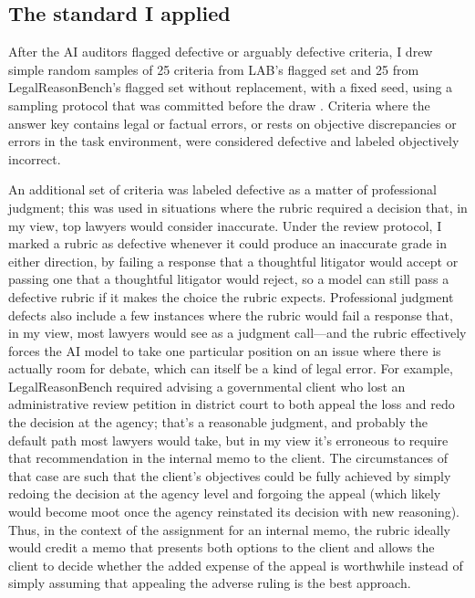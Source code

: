 \documentclass[11pt]{article}
\newcommand{\labSample}{25}
\newcommand{\lrbSample}{25}
\begin{document}
\subsection{The standard I applied}

After the AI auditors flagged defective or arguably defective criteria, I drew simple random samples of \labSample{} criteria from LAB's flagged set and \lrbSample{} from LegalReasonBench's flagged set without replacement, with a fixed seed, using a sampling protocol that was committed before the draw \citep{labreview,lrbreview}. Criteria where the answer key contains legal or factual errors, or rests on objective discrepancies or errors in the task environment, were considered defective and labeled objectively incorrect.

An additional set of criteria was labeled defective as a matter of professional judgment; this was used in situations where the rubric required a decision that, in my view, top lawyers would consider inaccurate. Under the review protocol, I marked a rubric as defective whenever it could produce an inaccurate grade in either direction, by failing a response that a thoughtful litigator would accept or passing one that a thoughtful litigator would reject, so a model can still pass a defective rubric if it makes the choice the rubric expects. Professional judgment defects also include a few instances where the rubric would fail a response that, in my view, most lawyers would see as a judgment call---and the rubric effectively forces the AI model to take one particular position on an issue where there is actually room for debate, which can itself be a kind of legal error. For example, LegalReasonBench required advising a governmental client who lost an administrative review petition in district court to both appeal the loss and redo the decision at the agency; that's a reasonable judgment, and probably the default path most lawyers would take, but in my view it's erroneous to require that recommendation in the internal memo to the client. The circumstances of that case are such that the client's objectives could be fully achieved by simply redoing the decision at the agency level and forgoing the appeal (which likely would become moot once the agency reinstated its decision with new reasoning). Thus, in the context of the assignment for an internal memo, the rubric ideally would credit a memo that presents both options to the client and allows the client to decide whether the added expense of the appeal is worthwhile instead of simply assuming that appealing the adverse ruling is the best approach.
\end{document}
